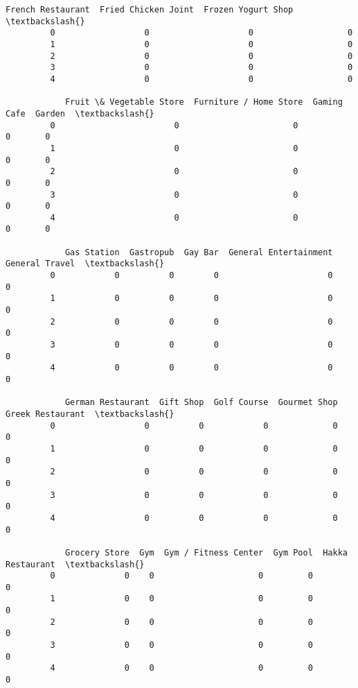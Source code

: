 \documentclass[11pt]{article}
\begin{document}
\begin{Verbatim}[commandchars=\\\{\}]
            French Restaurant  Fried Chicken Joint  Frozen Yogurt Shop  \textbackslash{}
         0                  0                    0                   0   
         1                  0                    0                   0   
         2                  0                    0                   0   
         3                  0                    0                   0   
         4                  0                    0                   0   
         
            Fruit \& Vegetable Store  Furniture / Home Store  Gaming Cafe  Garden  \textbackslash{}
         0                        0                       0            0       0   
         1                        0                       0            0       0   
         2                        0                       0            0       0   
         3                        0                       0            0       0   
         4                        0                       0            0       0   
         
            Gas Station  Gastropub  Gay Bar  General Entertainment  General Travel  \textbackslash{}
         0            0          0        0                      0               0   
         1            0          0        0                      0               0   
         2            0          0        0                      0               0   
         3            0          0        0                      0               0   
         4            0          0        0                      0               0   
         
            German Restaurant  Gift Shop  Golf Course  Gourmet Shop  Greek Restaurant  \textbackslash{}
         0                  0          0            0             0                 0   
         1                  0          0            0             0                 0   
         2                  0          0            0             0                 0   
         3                  0          0            0             0                 0   
         4                  0          0            0             0                 0   
         
            Grocery Store  Gym  Gym / Fitness Center  Gym Pool  Hakka Restaurant  \textbackslash{}
         0              0    0                     0         0                 0   
         1              0    0                     0         0                 0   
         2              0    0                     0         0                 0   
         3              0    0                     0         0                 0   
         4              0    0                     0         0                 0   
         

\end{Verbatim}
\end{document}
